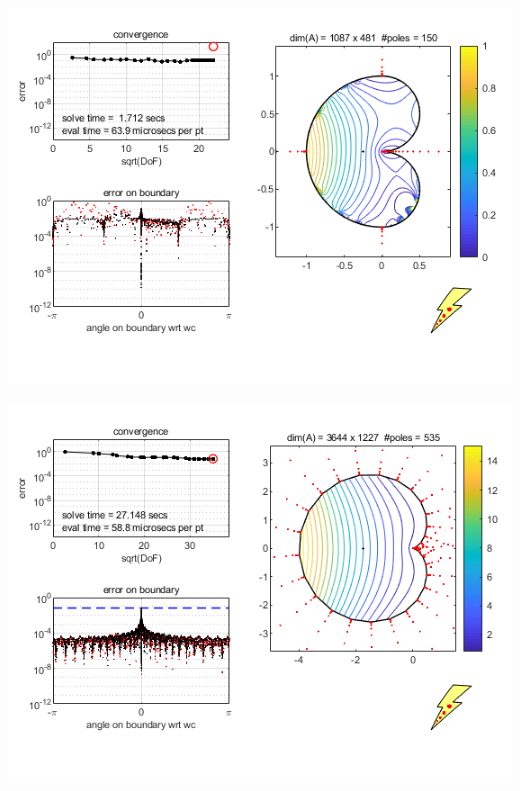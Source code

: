 \documentclass{seminar}
\begin{document}
\begin{slide}
\begin{center}
\includegraphics[scale=0.7]{./PNG/cusp3}
\end{center}
\end{slide}
\begin{slide}
\begin{center}
\includegraphics[scale=0.7]{./PNG/cardioid}
\end{center}
\end{slide} %
\end{document}
